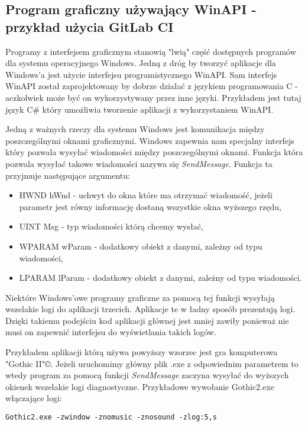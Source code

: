 \subsection{Program graficzny używający WinAPI - przykład użycia GitLab CI}
Programy z interfejsem graficznym stanowią "lwią" część dostępnych programów dla systemu operacyjnego Windows. Jedną z dróg by tworzyć aplikacje dla Windows'a jest użycie interfejsu programistycznego WinAPI. Sam interfejs WinAPI został zaprojektowany by dobrze działać z językiem programowania C - \cite{WinAPI} aczkolwiek może być on wykorzystywany przez inne języki. Przykładem jest tutaj język C\# który umożliwia tworzenie aplikacji z wykorzystaniem WinAPI. 
\par
Jedną z ważnych rzeczy dla systemu Windows jest komunikacja między poszczególnymi oknami graficznymi. Windows zapewnia nam specjalny interfejs który pozwala wysyłać wiadomości między poszczególnymi oknami. Funkcja która pozwala wysyłać takowe wiadomości nazywa się \textit{SendMessage}. Funkcja ta przyjmuje następujące argumentu:
\begin{itemize}
  \item HWND hWnd - uchwyt do okna które ma otrzymać wiadomość, jeżeli parametr jest równy informację dostaną wszystkie okna wyższego rzędu,
  \item UINT Msg - typ wiadomości którą chcemy wysłać,
  \item WPARAM wParam - dodatkowy obiekt z danymi, zależny od typu wiadomości,
  \item LPARAM lParam - dodatkowy obiekt z danymi, zależny od typu wiadomości.
\end{itemize}
Niektóre Windows'owe programy graficzne za pomocą tej funkcji wysyłają wszelakie logi do aplikacji trzecich. Aplikacje te w ładny sposób prezentują logi. Dzięki takiemu podejściu kod aplikacji głównej jest mniej zawiły ponieważ nie musi on zapewnić interfejsu do wyświetlania takich logów.
\par
Przykładem aplikacji którą używa powyższy wzorzec jest gra komputerowa "Gothic II"©. Jeżeli uruchomimy główny plik .exe z odpowiednim parametrem to wtedy program za pomocą funkcji \textit{SendMessage} zaczyna wysyłać do wyższych okienek wszelakie logi diagnostyczne. Przykładowe wywołanie Gothic2.exe włączające logi:
\begin{lstlisting}[caption={Gra Gothic włącza się w trybie okienkowym, bez muzyki i dźwięków oraz z wysyłaniem logów}]
  Gothic2.exe -zwindow -znomusic -znosound -zlog:5,s
\end{lstlisting}

